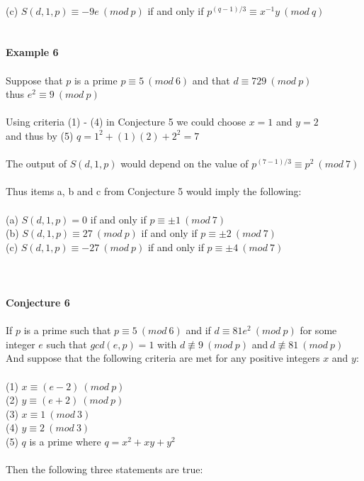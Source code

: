 \documentclass[final,letterpaper,oneside,10pt]{article}
\begin{document}
\\
(c) $S(d,1,p) \equiv -9e~(mod~p)$  if and only if $p^{(q-1)/3} \equiv x^{-1}y~(mod~q)$
\\
\\
\\
\textbf{Example 6}
\\
\\
Suppose that $p$ is a prime $p \equiv 5~(mod~6)$ and that $d \equiv 729~(mod~p)$ 
\\
thus $e^2 \equiv 9~(mod~p)$
\\
\\
Using criteria (1) - (4) in Conjecture 5 we could choose $x=1$ and $y=2$
\\
and thus by (5) $q = 1^2 + (1)(2) + 2^2 = 7$
\\
\\
The output of $S(d,1,p)$ would depend on the value of $p^{(7-1)/3} \equiv p^2~(mod~7)$
\\
\\
Thus items a, b and c from Conjecture 5 would imply the following:
\\
\\
(a) $S(d,1,p) = 0$ if and only if $p \equiv \pm 1~(mod~7)$
\\
(b) $S(d,1,p) \equiv 27~(mod~p)$ if and only if $p \equiv \pm 2~(mod~7)$
\\
(c) $S(d,1,p) \equiv -27~(mod~p)$ if and only if $p \equiv \pm 4~(mod~7)$
\\
\\
\\
\\
\textbf{Conjecture 6}
\\
\\
If $p$ is a prime such that $p \equiv 5~(mod~6)$ and if $d \equiv 81e^2~(mod~p)$ for some integer $e$ such that $gcd(e,p)=1$ with 
$d \not\equiv 9~(mod~p) $ and$~d \not\equiv 81~(mod~p) $
\\
And suppose that the following criteria are met for any positive integers $x$ and $y$:
\\
\\
(1) $x \equiv (e-2)~(mod~p)$
\\
(2) $y \equiv (e+2)~(mod~p)$
\\
(3) $x \equiv 1~(mod~3)$
\\
(4) $y \equiv 2~(mod~3)$
\\
(5) $q$ is a prime where $q = x^2 +xy + y^2$
\\
\\
Then the following three statements are true:
\end{document}
